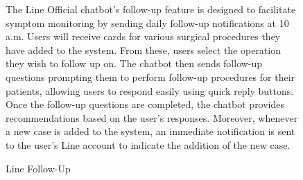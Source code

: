 \documentclass[12pt,oneside,openright,a4paper]{cpe-english-project}
\begin{document}
\begin{figure}[H]
\begin{minipage}{0.3\textwidth}
                \centering
              \end{minipage}
              \caption{Line Follow-Up}\label{fig:lineFollowUp}
              \begin{justify}
                \qquad The Line Official chatbot's follow-up feature is designed to facilitate symptom monitoring by sending daily follow-up notifications at 10 a.m. Users will receive cards for various surgical procedures they have added to the system. From these, users select the operation they wish to follow up on. The chatbot then sends follow-up questions prompting them to perform follow-up procedures for their patients, allowing users to respond easily using quick reply buttons. Once the follow-up questions are completed, the chatbot provides recommendations based on the user's responses. Moreover, whenever a new case is added to the system, an immediate notification is sent to the user's Line account to indicate the addition of the new case.\par

\end{justify}
\end{figure}
\end{document}
